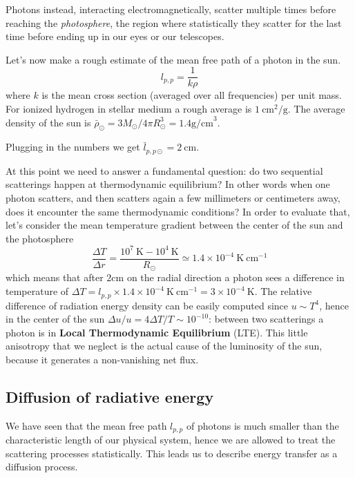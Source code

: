 Photons instead, interacting electromagnetically, scatter multiple times before reaching the \textit{photosphere}, the region where statistically they scatter for the last time before ending up in our eyes or our telescopes. 

Let's now make a rough estimate of the mean free path of a photon in the sun. 
\begin{equation}\label{mfp}
	l_{p,p}=\frac{1}{k \rho}
\end{equation}
where $k$ is the mean cross section (averaged over all frequencies) per unit mass. For ionized hydrogen in stellar medium a rough average is $1 \ \mathrm{cm^2/g}$. The average density of the sun is $\bar\rho_{\odot}=3M_{\odot}/4 \pi R_{\odot}^3= 1.4 \mathrm{g /cm}^3$. 

Plugging in the numbers we get $\bar l_{p,p \odot}=2 \  \mathrm{cm}$. 

At this point we need to answer a fundamental question: do two sequential scatterings happen at thermodynamic equilibrium? In other words when one photon scatters, and then scatters again a few millimeters or centimeters away, does it encounter the same thermodynamic conditions? In order to evaluate that, let's consider the mean temperature gradient between the center of the sun and the photosphere
$$
\frac{\Delta T}{\Delta r} = \frac{10^7 \ \mathrm{K}-10^4  \ \mathrm{K}}{R_{\odot}} \simeq 1.4 \times 10^{-4} \  \mathrm{K} \ \mathrm{cm} ^{-1}
$$
which means that after $2 \mathrm{cm}$ on the radial direction a photon sees a difference in temperature of $\Delta T = l_{p,p} \times 1.4 \times 10^{-4}  \  \mathrm{K} \ \mathrm{cm} ^{-1}= 3 \times 10^{-4} \  \mathrm{K}$. The relative difference of radiation energy density can be easily computed since $u \sim T^4$, hence in the center of the sun $\Delta u/u=4 \Delta T / T \sim 10^{-10}$: between two scatterings a photon is in \textbf{Local Thermodynamic Equilibrium} (LTE). This little anisotropy that we neglect is the actual cause of the luminosity of the sun, because it generates a non-vanishing net flux.
\subsection{Diffusion of radiative energy}
We have seen that the mean free path $l_{p,p}$ of photons is much smaller than the characteristic length of our physical system, hence we are allowed to treat the scattering processes statistically. This leads us to describe energy transfer as a diffusion process. 

